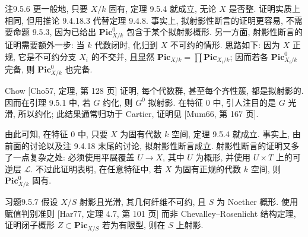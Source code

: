 \begin{origstatement}{注}{9.5.6}\label{ch09s05:rem9.5.6}
更一般地, 只要 $X/k$ 固有, 定理 9.5.4 就成立, 无论 $X$ 是否整. 证明实质上相同, 但用推论 9.4.18.3 代替定理 9.4.8. 事实上, 拟射影性断言的证明更容易, 不需要命题 9.5.3, 因为已给出 $\mathbf{Pic}^0_{X/k}$ 包含于某个拟射影概形. 另一方面, 射影性断言的证明需要额外一步: 当 $k$ 代数闭时, 化归到 $X$ 不可约的情形. 思路如下: 因为 $X$ 正规, 它是不可约分支 $X_i$ 的不交并, 且显然 $\mathbf{Pic}_{X/k}=\prod\mathbf{Pic}_{X_i/k}$; 因而若各 $\mathbf{Pic}^0_{X_i/k}$ 完备, 则 $\mathbf{Pic}^0_{X/k}$ 也完备.


Chow [Cho57, 定理, 第 128 页] 证明, 每个代数群, 甚至每个齐性簇, 都是拟射影的. 因而在引理 9.5.1 中, 若 $G$ 约化, 则 $G^0$ 拟射影. 在特征 $0$ 中, 引人注目的是 $G$ 光滑, 所以约化; 此结果通常归功于 Cartier, 证明见 [Mum66, 第 167 页].

由此可知, 在特征 $0$ 中, 只要 $X$ 为固有代数 $k$ 空间, 定理 9.5.4 就成立. 事实上, 由前面的讨论以及注 9.4.18 末尾的讨论, 拟射影性断言成立. 射影性断言的证明又多了一点复杂之处: 必须使用平展覆盖 $U\to X$, 其中 $U$ 为概形, 并使用 $U\times T$ 上的可逆层 $\mathcal L$. 不过此证明表明, 在任意特征中, 若 $X$ 为固有正规的代数 $k$ 空间, 则 $\mathbf{Pic}^0_{X/k}$ 固有.
\end{origstatement}

\begin{origstatement}{习题}{9.5.7}\label{ch09s05:ex9.5.7}
假设 $X/S$ 射影且光滑, 其几何纤维不可约, 且 $S$ 为 Noether 概形. 使用赋值判别准则 [Har77, 定理 4.7, 第 101 页] 而非 Chevalley--Rosenlicht 结构定理, 证明闭子概形 $Z\subset\mathbf{Pic}_{X/S}$ 若为有限型, 则在 $S$ 上射影.
\end{origstatement}

